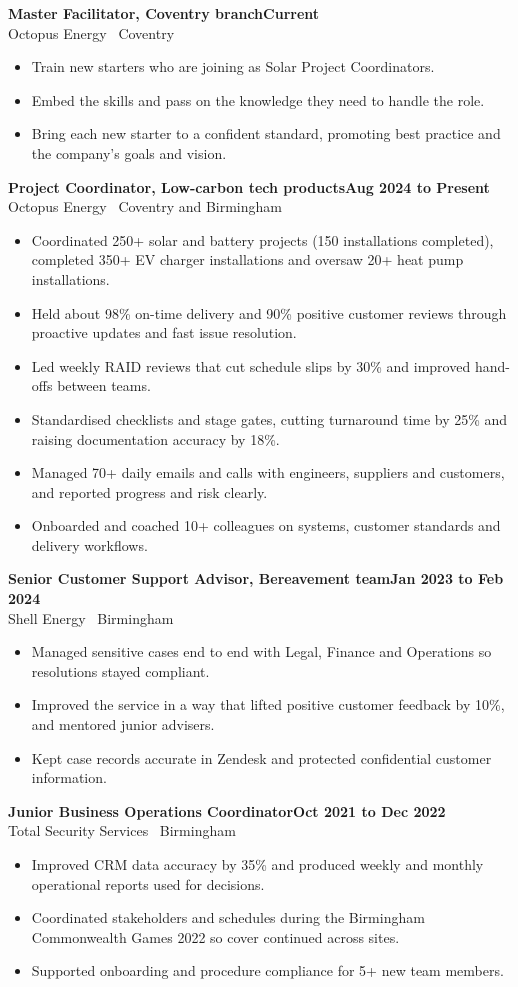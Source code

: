 \documentclass[10.5pt,a4paper]{article}
\newcommand{\role}[3]{%
  \vspace{0.45em}
  {\bfseries #1}\hfill{\bfseries #3}\\
  {\color{ink}#2}\par
  \vspace{0.1em}
}
\begin{document}
\role{Master Facilitator, Coventry branch}{Octopus Energy \textbar\ Coventry}{Current}
\begin{itemize}
  \item Train new starters who are joining as Solar Project Coordinators.
  \item Embed the skills and pass on the knowledge they need to handle the role.
  \item Bring each new starter to a confident standard, promoting best practice and the company's goals and vision.
\end{itemize}

\role{Project Coordinator, Low-carbon tech products}{Octopus Energy \textbar\ Coventry and Birmingham}{Aug 2024 to Present}
\begin{itemize}
  \item Coordinated 250+ solar and battery projects (150 installations completed), completed 350+ EV charger installations and oversaw 20+ heat pump installations.
  \item Held about 98\% on-time delivery and 90\% positive customer reviews through proactive updates and fast issue resolution.
  \item Led weekly RAID reviews that cut schedule slips by 30\% and improved hand-offs between teams.
  \item Standardised checklists and stage gates, cutting turnaround time by 25\% and raising documentation accuracy by 18\%.
  \item Managed 70+ daily emails and calls with engineers, suppliers and customers, and reported progress and risk clearly.
  \item Onboarded and coached 10+ colleagues on systems, customer standards and delivery workflows.
\end{itemize}

\role{Senior Customer Support Advisor, Bereavement team}{Shell Energy \textbar\ Birmingham}{Jan 2023 to Feb 2024}
\begin{itemize}
  \item Managed sensitive cases end to end with Legal, Finance and Operations so resolutions stayed compliant.
  \item Improved the service in a way that lifted positive customer feedback by 10\%, and mentored junior advisers.
  \item Kept case records accurate in Zendesk and protected confidential customer information.
\end{itemize}

\role{Junior Business Operations Coordinator}{Total Security Services \textbar\ Birmingham}{Oct 2021 to Dec 2022}
\begin{itemize}
  \item Improved CRM data accuracy by 35\% and produced weekly and monthly operational reports used for decisions.
  \item Coordinated stakeholders and schedules during the Birmingham Commonwealth Games 2022 so cover continued across sites.
  \item Supported onboarding and procedure compliance for 5+ new team members.
\end{itemize}
\end{document}

